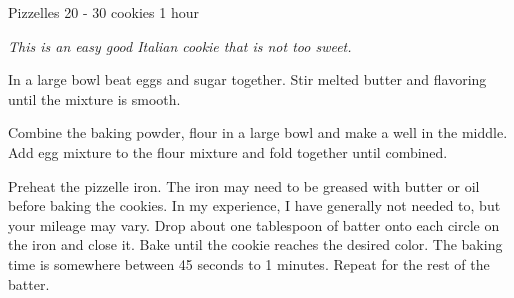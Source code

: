 \begin{recipe}{Pizzelles} {20 - 30 cookies} {1 hour}

\freeform \textit{This is an easy good Italian cookie that is not too sweet.}


In a large bowl beat eggs and sugar together. Stir melted butter and flavoring
    until the mixture is smooth.


Combine the baking powder, flour in a large bowl and make a well in the middle.
    Add egg mixture to the flour mixture and fold together until combined.

\freeform

Preheat the pizzelle iron. The iron may need to be greased with butter or oil
    before baking the cookies. In my experience, I have generally not needed to,
    but your mileage may vary. Drop about one tablespoon of batter onto each
    circle on the iron and close it. Bake until the cookie reaches the desired
    color. The baking time is somewhere between 45 seconds to 1  minutes.
    Repeat for the rest of the batter.

\freeform \hrulefill
\end{recipe}
